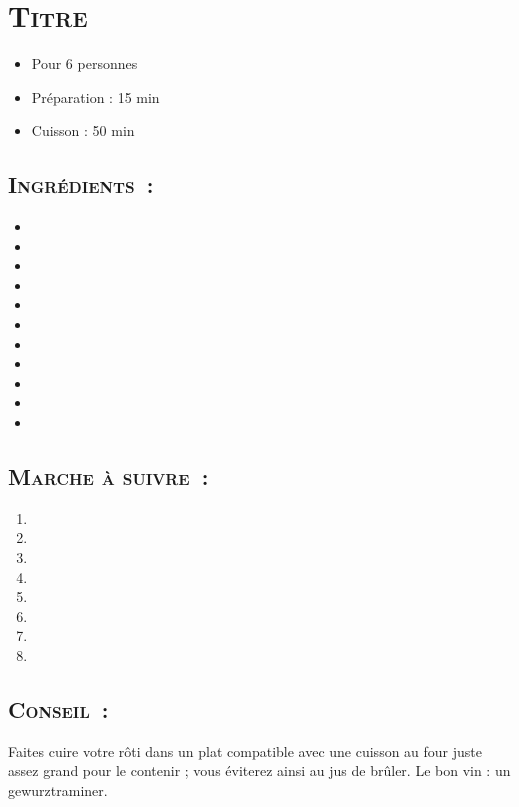 \section[\normalsize{Titre Sommaire}]{\LARGE{\textsc{Titre}}}		%


\begin{itemize}
\item Pour 6 personnes
\item Préparation : 15 min
\item Cuisson : 50 min
\end{itemize}

\subsection*{\textsc{Ingr\'edients~:}}

\begin{itemize}
\item 
\item 
\item	
\item
\item 
\item 
\item 
\item
\item 
\item 
\item 
\end{itemize}


\subsection*{\textsc{Marche \`a suivre~:}}

\begin{enumerate}

\item

\item 

\item 

\item 
\item
\item 
\item 
\item 
\end{enumerate}
\subsection*{\textsc{Conseil~:}}

Faites cuire votre r\^oti dans un plat compatible avec une cuisson au four juste assez grand pour le contenir ; vous \'eviterez ainsi au jus de br\^uler.
Le bon vin : un gewurztraminer.
